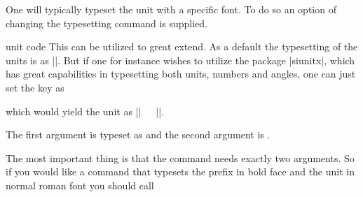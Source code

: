 One will typically typeset the unit with a specific font. To do so an option of changing the typesetting command is supplied.
\begin{pgfplotscodetwokey}{unit code}%
  This can be utilized to great extend. As a default the typesetting of the units is as ||. But if one for instance
  wishes to utilize the package |siunitx|, which has great capabilities in typesetting both units, numbers and angles, one can just set the key as
\begin{codeexample}
\end{codeexample}
  which would yield the unit as |\si{||}|. 

  The first argument is typeset as  and the second argument is .
  
  The most important thing is that the command needs exactly two arguments. So if you would like a command that typesets the prefix in bold face and the
  unit in normal roman font you should call
\begin{codeexample}[code only]
\pgfplotsset{unit code/.code 2 args={\mathbf{#1}\mathrm{#2}}
\end{codeexample}
\end{pgfplotscodetwokey}


